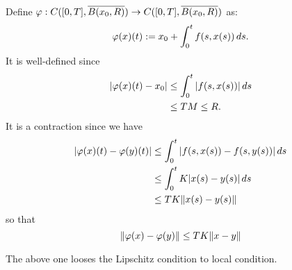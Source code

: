 \documentclass[11pt]{article}
\begin{document}
\begin{pf}
Define $\f:C([0,T],\cl{B(x_0,R)})\to C([0,T],\cl{B(x_0,R)})$ as:
\[\varphi(x)(t):=x_0+\int_0^tf(s,x(s))\,ds.\]
It is well-defined since
\begin{align*}
|\varphi(x)(t)-x_0|&\le\int_0^t|f(s,x(s))|\,ds\\
&\le TM\le R.
\end{align*}
It is a contraction since we have
\begin{align*}
|\varphi(x)(t)-\varphi(y)(t)|
&\le\int_0^t|f(s,x(s))-f(s,y(s))|\,ds\\
&\le\int_0^tK|x(s)-y(s)|\,ds\\
&\le TK\|x(s)-y(s)\|
\end{align*}
so that
\[\|\varphi(x)-\varphi(y)\|\le TK\|x-y\|\]
\end{pf}
The above one looses the Lipschitz condition to local condition.
\end{document}
